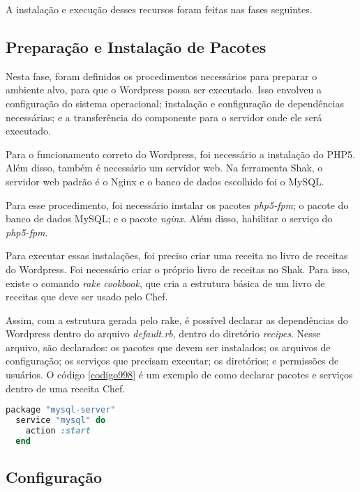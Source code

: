 A instalação e execução desses recursos foram feitas nas fases seguintes.

\subsection{Preparação e Instalação de Pacotes}
\label{wordpress:preparacao}

Nesta fase, foram definidos os procedimentos necessários para 
preparar o ambiente alvo, para que o Wordpress
possa ser executado. Isso envolveu a configuração do sistema operacional; instalação
e configuração de dependências necessárias; e a transferência do componente
para o servidor onde ele será executado.

Para o funcionamento correto do Wordpress, foi necessário a instalação do PHP5. Além
disso, também é necessário um servidor web. Na ferramenta Shak, o servidor
web padrão é o Nginx e o banco de dados escolhido foi o MySQL.

Para esse procedimento, foi necessário instalar os pacotes \textit{php5-fpm}; o pacote
do banco de dados MySQL; e o pacote \textit{nginx}. Além disso, habilitar o serviço do
\textit{php5-fpm}.
 
Para executar essas instalações, foi preciso criar uma receita no livro de receitas
do Wordpress. Foi necessário criar o próprio livro de receitas no Shak.
Para isso, existe o comando \textit{rake cookbook}, que cria a estrutura básica
de um livro de receitas que deve ser usado pelo Chef.

Assim, com a estrutura gerada pelo rake, é possível declarar as dependências do Wordpress
dentro do arquivo \textit{default.rb}, dentro do diretório \textit{recipes}. Nesse 
arquivo, são declarados: os pacotes que devem ser instalados; os arquivos de configuração;
os serviços que precisam executar; os diretórios; e permissões de usuários. O código \ref{codigo998}
é um exemplo de como declarar pacotes e serviços dentro de uma receita Chef.

\begin{lstlisting}[language=Ruby,label=dice_index,caption={Exemplo de criação de serviço do mysql com o chef}, label=codigo998]
  package "mysql-server"
  service "mysql" do
    action :start
  end
\end{lstlisting}

\subsection{Configuração}
\label{wordpress:preparacao}

